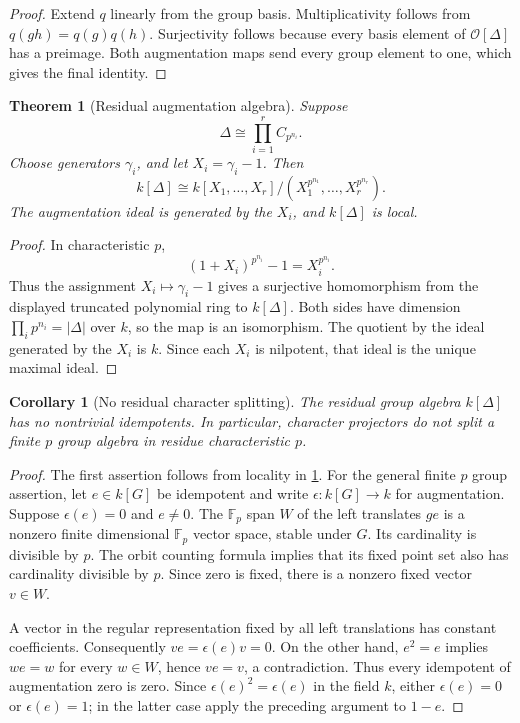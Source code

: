 \documentclass[11pt]{amsart}
\newtheorem{theorem}{Theorem}[section]
\newtheorem{corollary}[corollary]{Corollary}
\theoremstyle{definition}
\theoremstyle{remark}
\newcommand{\OO}{\mathcal O}
\newcommand{\FF}{\mathbb F}
\newcommand{\abs}[1]{\left\lvert#1\right\rvert}
\begin{document}
\begin{proof}
Extend \(q\) linearly from the group basis. Multiplicativity follows from \(q(gh)=q(g)q(h)\). Surjectivity follows because every basis element of \(\OO[\Delta]\) has a preimage. Both augmentation maps send every group element to one, which gives the final identity.
\end{proof}

\begin{theorem}[Residual augmentation algebra]\label{thm:residual_augmentation_algebra}
Suppose
\[
\Delta\cong
\prod_{i=1}^{r}C_{p^{n_i}}.
\]
Choose generators \(\gamma_i\), and let \(X_i=\gamma_i-1\). Then
\[
\boxed{
k[\Delta]
\cong
k[X_1,\ldots,X_r]
\big/
(X_1^{p^{n_1}},\ldots,X_r^{p^{n_r}}).
}
\]
The augmentation ideal is generated by the \(X_i\), and \(k[\Delta]\) is local.
\end{theorem}

\begin{proof}
In characteristic \(p\),
\[
(1+X_i)^{p^{n_i}}-1=X_i^{p^{n_i}}.
\]
Thus the assignment \(X_i\mapsto\gamma_i-1\) gives a surjective homomorphism from the displayed truncated polynomial ring to \(k[\Delta]\). Both sides have dimension \(\prod_ip^{n_i}=\abs{\Delta}\) over \(k\), so the map is an isomorphism. The quotient by the ideal generated by the \(X_i\) is \(k\). Since each \(X_i\) is nilpotent, that ideal is the unique maximal ideal.
\end{proof}

\begin{corollary}[No residual character splitting]\label{cor:no_residual_character_splitting}
The residual group algebra \(k[\Delta]\) has no nontrivial idempotents. In particular, character projectors do not split a finite \(p\) group algebra in residue characteristic \(p\).
\end{corollary}

\begin{proof}
The first assertion follows from locality in \cref{thm:residual_augmentation_algebra}. For the general finite \(p\) group assertion, let \(e\in k[G]\) be idempotent and write \(\epsilon:k[G]\to k\) for augmentation. Suppose \(\epsilon(e)=0\) and \(e\ne0\). The \(\FF_p\) span \(W\) of the left translates \(ge\) is a nonzero finite dimensional \(\FF_p\) vector space, stable under \(G\). Its cardinality is divisible by \(p\). The orbit counting formula implies that its fixed point set also has cardinality divisible by \(p\). Since zero is fixed, there is a nonzero fixed vector \(v\in W\).

A vector in the regular representation fixed by all left translations has constant coefficients. Consequently \(ve=\epsilon(e)v=0\). On the other hand, \(e^2=e\) implies \(we=w\) for every \(w\in W\), hence \(ve=v\), a contradiction. Thus every idempotent of augmentation zero is zero. Since \(\epsilon(e)^2=\epsilon(e)\) in the field \(k\), either \(\epsilon(e)=0\) or \(\epsilon(e)=1\); in the latter case apply the preceding argument to \(1-e\).
\end{proof}
\end{document}
